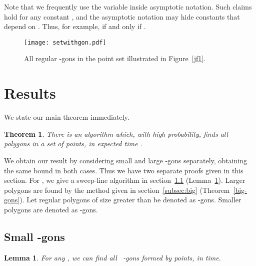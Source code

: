 \documentclass{article}
\newtheorem{theorem}{Theorem}
\newtheorem{lemma}{Lemma}
\begin{document}
Note that we frequently use the variable  inside asymptotic notation. Such claims hold for any constant , and the asymptotic notation may hide constants that depend on . Thus, for example,  if and only if .


\begin{figure}[t!]
\center\texttt{[image: setwithgon.pdf]}
\caption{All regular -gons in the point set illustrated
in Figure~\ref{jf1}.}
\label{jf2}
\end{figure}


\section{Results}
We state our main theorem immediately.
\begin{theorem}
There is an algorithm which, with high probability, finds all  polygons in a set of  points,
in expected time .
\end{theorem}
We obtain our result by considering small and large -gons separately, obtaining the same bound in both cases.   Thus we have two separate proofs given in this section.
For , we give a sweep-line algorithm in section~\ref{subsec:small} (Lemma~\ref{l1}).
Larger polygons are found by the method given in section~\ref{subsec:big} (Theorem~\ref{big-gons}).
Let regular polygons of size greater than  be denoted as -gons.
Smaller polygons are denoted as  -gons.

\subsection{Small -gons}
\label{subsec:small}
\begin{lemma}
\label{l1}
For any , we can 
find all ~-gons formed by  points, in  time. 
\end{lemma}
\end{document}

